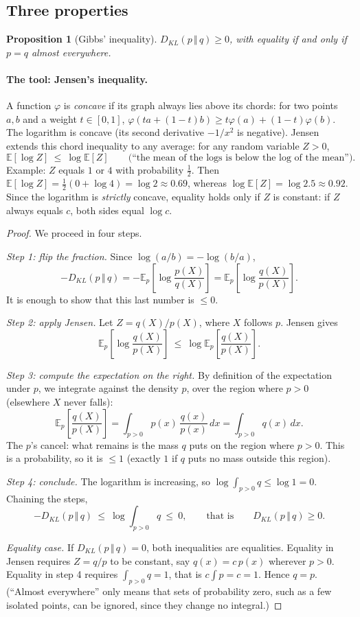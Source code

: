 \documentclass[11pt]{article}
\theoremstyle{plain}
\newtheorem{proposition}{Proposition}[section]
\theoremstyle{definition}
\theoremstyle{remark}
\newcommand{\E}{\mathbb{E}}
\newcommand{\KL}[2]{D_{KL}\!\left(#1\,\Vert\,#2\right)}
\begin{document}
\subsection{Three properties}

\begin{proposition}[Gibbs' inequality]
\label{prop:gibbs}
$\KL{p}{q}\ge0$, with equality if and only if $p=q$ almost everywhere.
\end{proposition}

\paragraph{The tool: Jensen's inequality.} A function $\varphi$ is
\emph{concave} if its graph always lies above its chords: for two points $a,b$
and a weight $t\in[0,1]$, $\varphi(ta+(1-t)b)\ge t\varphi(a)+(1-t)\varphi(b)$.
The logarithm is concave (its second derivative $-1/x^2$ is negative). Jensen
extends this chord inequality to any average: for any random variable $Z>0$,
\[
\E[\log Z]\ \le\ \log\E[Z]
\qquad\text{(``the mean of the logs is below the log of the mean'')}.
\]
Example: $Z$ equals $1$ or $4$ with probability $\tfrac12$. Then
$\E[\log Z]=\tfrac12(0+\log4)=\log2\approx0.69$, whereas
$\log\E[Z]=\log2.5\approx0.92$. Since the logarithm is \emph{strictly}
concave, equality holds only if $Z$ is constant: if $Z$ always equals $c$,
both sides equal $\log c$.

\begin{proof}
We proceed in four steps.

\emph{Step 1: flip the fraction.} Since $\log(a/b)=-\log(b/a)$,
\[
-\KL{p}{q}=-\E_p\!\left[\log\frac{p(X)}{q(X)}\right]
=\E_p\!\left[\log\frac{q(X)}{p(X)}\right].
\]
It is enough to show that this last number is $\le0$.

\emph{Step 2: apply Jensen.} Let $Z=q(X)/p(X)$, where $X$ follows $p$. Jensen
gives
\[
\E_p\!\left[\log\frac{q(X)}{p(X)}\right]\ \le\ \log\E_p\!\left[\frac{q(X)}{p(X)}\right].
\]

\emph{Step 3: compute the expectation on the right.} By definition of the
expectation under $p$, we integrate against the density $p$, over the region
where $p>0$ (elsewhere $X$ never falls):
\[
\E_p\!\left[\frac{q(X)}{p(X)}\right]
=\int_{p>0}p(x)\,\frac{q(x)}{p(x)}\,dx
=\int_{p>0}q(x)\,dx .
\]
The $p$'s cancel: what remains is the mass $q$ puts on the region where
$p>0$. This is a probability, so it is $\le1$ (exactly $1$ if $q$ puts no mass
outside this region).

\emph{Step 4: conclude.} The logarithm is increasing, so
$\log\int_{p>0}q\le\log1=0$. Chaining the steps,
\[
-\KL{p}{q}\ \le\ \log\int_{p>0}q\ \le\ 0,
\qquad\text{that is}\qquad \KL{p}{q}\ge0 .
\]

\emph{Equality case.} If $\KL{p}{q}=0$, both inequalities are equalities.
Equality in Jensen requires $Z=q/p$ to be constant, say $q(x)=c\,p(x)$
wherever $p>0$. Equality in step 4 requires $\int_{p>0}q=1$, that is
$c\int p=c=1$. Hence $q=p$. (``Almost everywhere'' only means that sets of
probability zero, such as a few isolated points, can be ignored, since they
change no integral.)
\end{proof}
\end{document}
